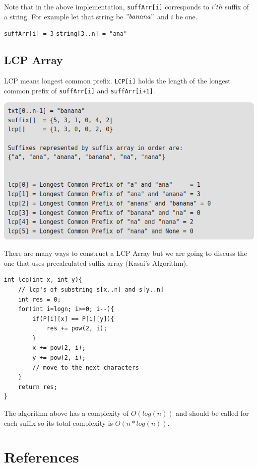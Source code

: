 \documentclass[12pt]{article}
\begin{document}
    Note that in the above implementation, \texttt{suffArr[i]} corresponds to $i'th$ suffix of a string. For example let that string be $"banana"$ and $i$ be one.
    
    \texttt{suffArr[i] = 3}
    \texttt{string[3..n] = "ana"}
    
    \newpage
    
    	\subsection{LCP Array}
    	LCP means longest common prefix. \texttt{LCP[i]} holds the length of the longest common prefix of \texttt{suffArr[i]} and \texttt{suffArr[i+1]}.
    	
    	\includegraphics[width=\linewidth/1]{lcp.png}
    	
    	There are many ways to construct a LCP Array but we are going to discuss the one that uses precalculated suffix array (Kasai's Algorithm).
    	
\begin{verbatim}
int lcp(int x, int y){
    // lcp's of substring s[x..n] and s[y..n]
    int res = 0;
    for(int i=logn; i>=0; i--){
        if(P[i][x] == P[i][y]){
            res += pow(2, i);
        }
        x += pow(2, i);
        y += pow(2, i);
        // move to the next characters
    }
    return res;
}
\end{verbatim}

    The algorithm above has a complexity of $O(log(n))$ and should be called for each suffix so its total complexity is $O(n*log(n))$.
    	
       \newpage
	   \section{References}
    	
\end{document}
